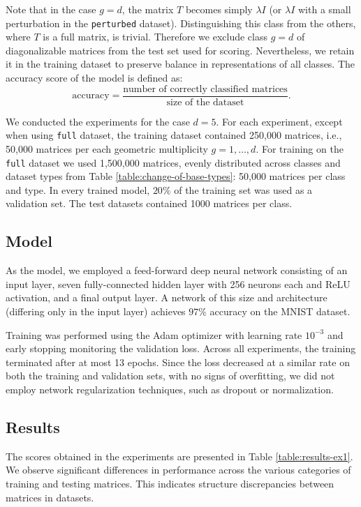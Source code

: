 Note that in the case $g=d$, the matrix $T$ becomes simply $\lambda I$ (or $\lambda I$ with a small perturbation in the \texttt{perturbed} dataset). Distinguishing this class from the others, where $T$ is a full matrix, is trivial. Therefore we exclude class $g=d$ of diagonalizable matrices from the test set used for scoring. Nevertheless, we retain it in the training dataset to preserve balance in representations of all classes. The accuracy score of the model is defined as:
\begin{equation*}
    \text{accuracy} = \frac{\text{number of correctly classified matrices}}{\text{size of the dataset}}.
\end{equation*}

We conducted the experiments for the case $d=5$. For each experiment, except when using \texttt{full} dataset, the training dataset contained 250{,}000 matrices, i.e., 50{,}000 matrices per each geometric multiplicity $g=1,\dots,d$. For training on the \texttt{full} dataset we used 1{,}500{,}000 matrices, evenly distributed across classes and dataset types from Table \ref{table:change-of-base-types}: 50{,}000 matrices per class and type. In every trained model, $20\%$ of the training set was used as a validation set. The test datasets contained 1000 matrices per class. 

\subsection*{Model}
As the model, we employed a feed-forward deep neural network consisting of an input layer, seven fully-connected hidden layer with 256 neurons each and ReLU activation, and a final output layer. A network of this size and architecture (differing only in the input layer) achieves $97\%$ accuracy on the MNIST dataset. 

Training was performed using the Adam optimizer with learning rate $10^{-3}$ and early stopping monitoring the validation loss. Across all experiments, the training terminated after at most 13 epochs. Since the loss decreased at a similar rate on both the training and validation sets, with no signs of overfitting, we did not employ network regularization techniques, such as dropout or normalization.

\subsection*{Results}
The scores obtained in the experiments are presented in Table \ref{table:results-ex1}. We observe significant differences in performance across the various categories of training and testing matrices. This indicates structure discrepancies between matrices in datasets. 

